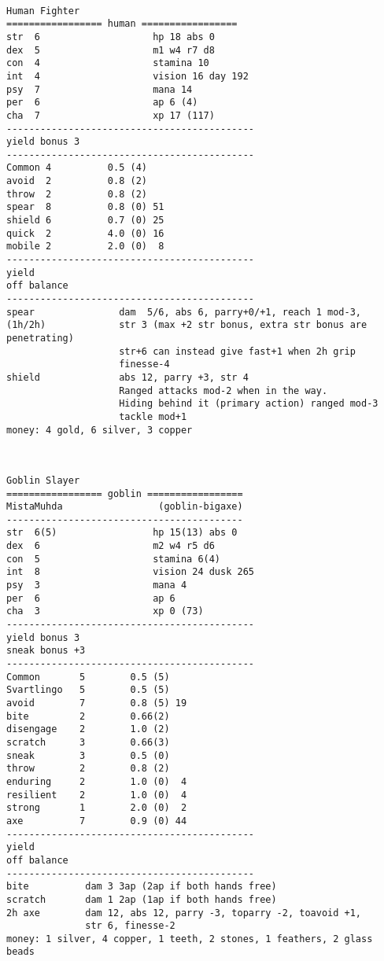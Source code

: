 \


\pagebreak[3]
\tiny \begin{samepage} \begin{verbatim}
Human Fighter
================= human =================
str  6                    hp 18 abs 0
dex  5                    m1 w4 r7 d8
con  4                    stamina 10
int  4                    vision 16 day 192
psy  7                    mana 14
per  6                    ap 6 (4)
cha  7                    xp 17 (117)
--------------------------------------------
yield bonus 3
--------------------------------------------
Common 4          0.5 (4)
avoid  2          0.8 (2)
throw  2          0.8 (2)
spear  8          0.8 (0) 51
shield 6          0.7 (0) 25
quick  2          4.0 (0) 16
mobile 2          2.0 (0)  8
--------------------------------------------
yield
off balance
--------------------------------------------
spear               dam  5/6, abs 6, parry+0/+1, reach 1 mod-3,
(1h/2h)             str 3 (max +2 str bonus, extra str bonus are penetrating)
                    str+6 can instead give fast+1 when 2h grip
                    finesse-4
shield              abs 12, parry +3, str 4
                    Ranged attacks mod-2 when in the way.
                    Hiding behind it (primary action) ranged mod-3
                    tackle mod+1
money: 4 gold, 6 silver, 3 copper
\end{verbatim} \end{samepage} \normalsize


\


\pagebreak[3]
\tiny \begin{samepage} \begin{verbatim}
Goblin Slayer
================= goblin =================
MistaMuhda                 (goblin-bigaxe)
------------------------------------------
str  6(5)                 hp 15(13) abs 0
dex  6                    m2 w4 r5 d6
con  5                    stamina 6(4)
int  8                    vision 24 dusk 265
psy  3                    mana 4
per  6                    ap 6
cha  3                    xp 0 (73)
--------------------------------------------
yield bonus 3
sneak bonus +3
--------------------------------------------
Common       5        0.5 (5)
Svartlingo   5        0.5 (5)
avoid        7        0.8 (5) 19
bite         2        0.66(2)
disengage    2        1.0 (2)
scratch      3        0.66(3)
sneak        3        0.5 (0)
throw        2        0.8 (2)
enduring     2        1.0 (0)  4
resilient    2        1.0 (0)  4
strong       1        2.0 (0)  2
axe          7        0.9 (0) 44
--------------------------------------------
yield
off balance
--------------------------------------------
bite          dam 3 3ap (2ap if both hands free)
scratch       dam 1 2ap (1ap if both hands free)
2h axe        dam 12, abs 12, parry -3, toparry -2, toavoid +1,
              str 6, finesse-2
money: 1 silver, 4 copper, 1 teeth, 2 stones, 1 feathers, 2 glass beads
\end{verbatim} \end{samepage} \normalsize


